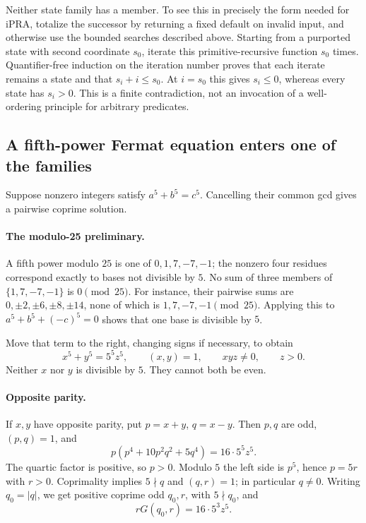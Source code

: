 Neither state family has a member.  To see this in precisely the form
needed for iPRA, totalize the successor by returning a fixed default
on invalid input, and otherwise use the bounded searches described
above.  Starting from a purported state with second coordinate \(s_0\),
iterate this primitive-recursive function \(s_0\) times.
Quantifier-free induction on the iteration number proves that each
iterate remains a state and that
\(s_i+i\le s_0\).
At \(i=s_0\) this gives \(s_i\le0\), whereas every state has
\(s_i>0\).  This is a finite contradiction, not an invocation of
a well-ordering principle for arbitrary predicates.

\subsection{A fifth-power Fermat equation enters one of the families}

Suppose nonzero integers satisfy \(a^5+b^5=c^5\).
Cancelling their common gcd gives a pairwise coprime solution.

\paragraph{The modulo-25 preliminary.}
A fifth power modulo \(25\) is one of
\(0,1,7,-7,-1\); the nonzero four residues correspond exactly to
bases not divisible by \(5\).
No sum of three members of \(\{1,7,-7,-1\}\) is \(0\pmod {25}\).
For instance, their pairwise sums are
\(0,\pm2,\pm6,\pm8,\pm14\), none of which is
\(1,7,-7,-1\pmod {25}\).
Applying this to \(a^5+b^5+(-c)^5=0\) shows that one base is divisible
by \(5\).

Move that term to the right, changing signs if necessary, to obtain
\[
 x^5+y^5=5^5z^5,\qquad
 (x,y)=1,\qquad xyz\ne0,\qquad z>0.
 \tag{Q16}\label{eq:quintic-normalized}
\]
Neither \(x\) nor \(y\) is divisible by \(5\).
They cannot both be even.

\paragraph{Opposite parity.}
If \(x,y\) have opposite parity, put
\(p=x+y\), \(q=x-y\).  Then \(p,q\) are odd,
\((p,q)=1\), and
\[
 p(p^4+10p^2q^2+5q^4)=16\cdot5^5z^5.
\]
The quartic factor is positive, so \(p>0\).
Modulo \(5\) the left side is \(p^5\), hence \(p=5r\) with \(r>0\).
Coprimality implies \(5\nmid q\) and \((q,r)=1\);
in particular \(q\ne0\).
Writing \(q_0=|q|\), we get positive coprime odd \(q_0,r\), with
\(5\nmid q_0\), and
\[
 rG(q_0,r)=16\cdot5^3z^5.
 \tag{Q17}\label{eq:quintic-core}
\]

